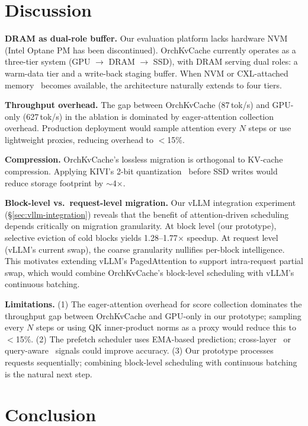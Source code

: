 \documentclass[conference]{IEEEtran}
\begin{document}
\section{Discussion}

\textbf{DRAM as dual-role buffer.} Our evaluation platform lacks hardware NVM (Intel Optane PM has been discontinued). OrchKvCache currently operates as a three-tier system (GPU $\to$ DRAM $\to$ SSD), with DRAM serving dual roles: a warm-data tier and a write-back staging buffer. When NVM or CXL-attached memory~\cite{tpp} becomes available, the architecture naturally extends to four tiers.

\textbf{Throughput overhead.} The gap between OrchKvCache (87\,tok/s) and GPU-only (627\,tok/s) in the ablation is dominated by eager-attention collection overhead. Production deployment would sample attention every $N$ steps or use lightweight proxies, reducing overhead to $<$15\%.

\textbf{Compression.} OrchKvCache's lossless migration is orthogonal to KV-cache compression. Applying KIVI's 2-bit quantization~\cite{kivi} before SSD writes would reduce storage footprint by ${\sim}$4$\times$.

\textbf{Block-level vs.\ request-level migration.} Our vLLM integration experiment (\S\ref{sec:vllm-integration}) reveals that the benefit of attention-driven scheduling depends critically on migration granularity. At block level (our prototype), selective eviction of cold blocks yields 1.28--1.77$\times$ speedup. At request level (vLLM's current swap), the coarse granularity nullifies per-block intelligence. This motivates extending vLLM's PagedAttention to support intra-request partial swap, which would combine OrchKvCache's block-level scheduling with vLLM's continuous batching.

\textbf{Limitations.} (1) The eager-attention overhead for score collection dominates the throughput gap between OrchKvCache and GPU-only in our prototype; sampling every $N$ steps or using QK inner-product norms as a proxy would reduce this to $<$15\%. (2) The prefetch scheduler uses EMA-based prediction; cross-layer~\cite{infinigen} or query-aware~\cite{quest} signals could improve accuracy. (3) Our prototype processes requests sequentially; combining block-level scheduling with continuous batching is the natural next step.

\section{Conclusion}
\end{document}
